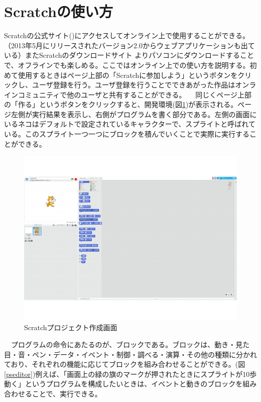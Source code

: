 \documentclass[a4paper,10pt,onecolumn,oneside,openany]{jsbook}
\begin{document}
\section{Scratchの使い方}
Scratchの公式サイト(\cite{scratch})にアクセスしてオンライン上で使用することができる。（2013年5月にリリースされたバージョン2.0からウェブアプリケーションも出ている）またScratchのダウンロードサイト\cite{scratch_official}
よりパソコンにダウンロードすることで、オフラインでも楽しめる。ここではオンライン上での使い方を説明する。初めて使用するときはページ上部の「Scratchに参加しよう」というボタンをクリックし、ユーザ登録を行う。ユーザ登録を行うことでできあがった作品はオンラインコミュニティで他のユーザと共有することができる。
　同じくページ上部の「作る」というボタンをクリックすると、開発環境(図\ref{editor})が表示される。ページ左側が実行結果を表示し、右側がプログラムを書く部分である。左側の画面にいるネコはデフォルトで設定されているキャラクターで、スプライトと呼ばれている。このスプライト一つ一つにブロックを積んでいくことで実際に実行することができる。
\begin{figure}[!h]
  \centering
    \includegraphics[scale=0.5]{scratch_editor_main.pdf}
  \caption{Scratchプロジェクト作成画面}
  \label{editor}
 \end{figure}
　プログラムの命令にあたるのが、ブロックである。ブロックは、動き・見た目・音・ペン・データ・イベント・制御・調べる・演算・その他の種類に分かれており、それぞれの機能に応じてブロックを組み合わせることができる。(図\ref{pseditor})例えば、「画面上の緑の旗のマークが押されたときにスプライトが10歩動く」というプログラムを構成したいときは、イベントと動きのブロックを組み合わせることで、実行できる。
\end{document}
